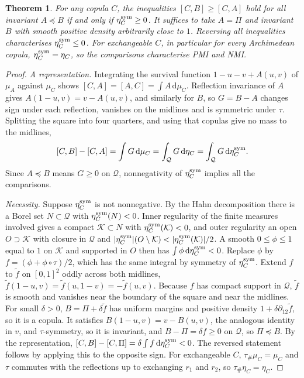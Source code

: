 \documentclass[11pt,a4paper]{article}
\newtheorem{theorem}{Theorem}[section]
\theoremstyle{remark}
\newcommand{\dd}{\,\mathrm d}
\newcommand{\Qq}{\mathcal Q}
\begin{document}
\begin{theorem}\label{thm:dual}
For any copula $C$, the inequalities $[C,B]\geq[C,A]$ hold for all invariant $A\preceq B$ if and only if $\eta_C^{\rm sym}\geq0$. It suffices to take $A=\Pi$ and invariant $B$ with smooth positive density arbitrarily close to $1$. Reversing all inequalities characterises $\eta_C^{\rm sym}\leq0$. For exchangeable $C$, in particular for every Archimedean copula, $\eta_C^{\rm sym}=\eta_C$, so the comparisons characterise PMI and NMI.
\end{theorem}
\begin{proof}
\emph{A representation.} Integrating the survival function $1-u-v+A(u,v)$ of $\mu_A$ against $\mu_C$ shows $[C,A]=[A,C]=\int A\dd\mu_C$. Reflection invariance of $A$ gives $A(1-u,v)=v-A(u,v)$, and similarly for $B$, so $G=B-A$ changes sign under each reflection, vanishes on the midlines and is symmetric under $\tau$. Splitting the square into four quarters, and using that copulas give no mass to the midlines,
\[
 [C,B]-[C,A]=\int G\dd\mu_C=\int_{\Qq}G\dd\eta_C=\int_{\Qq}G\dd\eta_C^{\rm sym}.
\]
Since $A\preceq B$ means $G\geq0$ on $\Qq$, nonnegativity of $\eta_C^{\rm sym}$ implies all the comparisons.

\emph{Necessity.} Suppose $\eta_C^{\rm sym}$ is not nonnegative. By the Hahn decomposition there is a Borel set $N\subset\Qq$ with $\eta_C^{\rm sym}(N)<0$. Inner regularity of the finite measures involved gives a compact $\mathcal K\subset N$ with $\eta_C^{\rm sym}(\mathcal K)<0$, and outer regularity an open $O\supset\mathcal K$ with closure in $\Qq$ and $|\eta_C^{\rm sym}|(O\setminus\mathcal K)<|\eta_C^{\rm sym}(\mathcal K)|/2$. A smooth $0\leq\phi\leq1$ equal to $1$ on $\mathcal K$ and supported in $O$ then has $\int\phi\dd\eta_C^{\rm sym}<0$. Replace $\phi$ by $f=(\phi+\phi\circ\tau)/2$, which has the same integral by symmetry of $\eta_C^{\rm sym}$. Extend $f$ to $\widetilde f$ on $[0,1]^2$ oddly across both midlines, $\widetilde f(1-u,v)=\widetilde f(u,1-v)=-\widetilde f(u,v)$. Because $f$ has compact support in $\Qq$, $\widetilde f$ is smooth and vanishes near the boundary of the square and near the midlines. For small $\delta>0$, $B=\Pi+\delta\widetilde f$ has uniform margins and positive density $1+\delta\partial_{12}\widetilde f$, so it is a copula. It satisfies $B(1-u,v)=v-B(u,v)$, the analogous identity in $v$, and $\tau$-symmetry, so it is invariant, and $B-\Pi=\delta f\geq0$ on $\Qq$, so $\Pi\preceq B$. By the representation, $[C,B]-[C,\Pi]=\delta\int f\dd\eta_C^{\rm sym}<0$. The reversed statement follows by applying this to the opposite sign. For exchangeable $C$, $\tau_\#\mu_C=\mu_C$ and $\tau$ commutes with the reflections up to exchanging $r_1$ and $r_2$, so $\tau_\#\eta_C=\eta_C$.
\end{proof}
\end{document}
